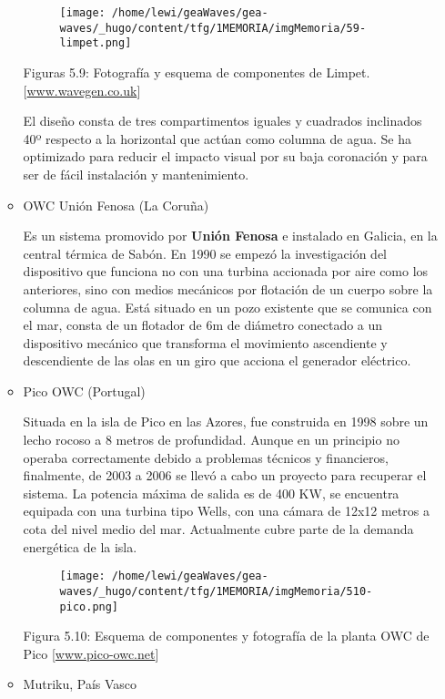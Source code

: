 \begin{itemize}
\begin{itemize}
    \begin{figure}
    \centering
    \texttt{[image: /home/lewi/geaWaves/gea-waves/\_hugo/content/tfg/1MEMORIA/imgMemoria/59-limpet.png]}
    \caption{}
    \end{figure}

    Figuras 5.9: Fotografía y esquema de componentes de Limpet.
    {[}\url{www.wavegen.co.uk}{]}

    El diseño consta de tres compartimentos iguales y cuadrados
    inclinados 40º respecto a la horizontal que actúan como columna de
    agua. Se ha optimizado para reducir el impacto visual por su baja
    coronación y para ser de fácil instalación y mantenimiento.
  \item
    OWC Unión Fenosa (La Coruña)

    Es un sistema promovido por \textbf{Unión Fenosa} e instalado en
    Galicia, en la central térmica de Sabón. En 1990 se empezó la
    investigación del dispositivo que funciona no con una turbina
    accionada por aire como los anteriores, sino con medios mecánicos
    por flotación de un cuerpo sobre la columna de agua. Está situado en
    un pozo existente que se comunica con el mar, consta de un flotador
    de 6m de diámetro conectado a un dispositivo mecánico que transforma
    el movimiento ascendiente y descendiente de las olas en un giro que
    acciona el generador eléctrico. 
  \item
    Pico OWC (Portugal)

    Situada en la isla de Pico en las Azores, fue construida en 1998
    sobre un lecho rocoso a 8 metros de profundidad. Aunque en un
    principio no operaba correctamente debido a problemas técnicos y
    financieros, finalmente, de 2003 a 2006 se llevó a cabo un proyecto
    para recuperar el sistema. La potencia máxima de salida es de 400
    KW, se encuentra equipada con una turbina tipo Wells, con una cámara
    de 12x12 metros a cota del nivel medio del mar. Actualmente cubre
    parte de la demanda energética de la isla.

    \begin{figure}
    \centering
    \texttt{[image: /home/lewi/geaWaves/gea-waves/\_hugo/content/tfg/1MEMORIA/imgMemoria/510-pico.png]}
    \caption{}
    \end{figure}

    Figura 5.10: Esquema de componentes y fotografía de la planta OWC de
    Pico {[}\url{www.pico-owc.net}{]} 
  \item
    Mutriku, País Vasco


\end{itemize}
\end{itemize}
